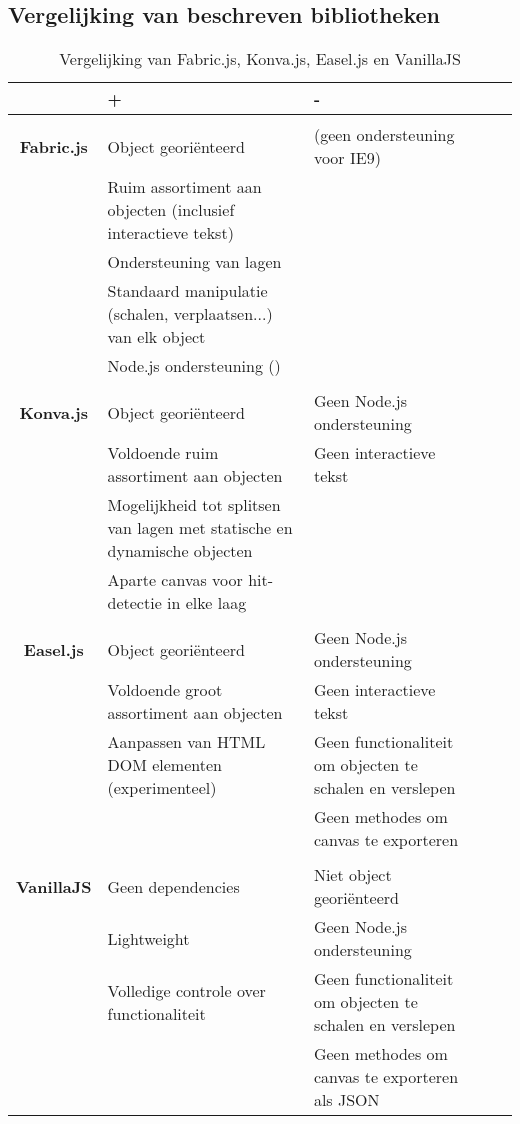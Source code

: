 \newpage
\subsection{Vergelijking van beschreven bibliotheken}

\begin{table}[ht!]
	\begin{center}
	\begin{tabular}[c]{clllc}
	\hline
	 & + & - \\
	\hline
						& & \\
	\textbf{Fabric.js}  & Object geori\"{e}nteerd &  (geen ondersteuning voor IE9)\\
						& Ruim assortiment aan objecten (inclusief interactieve tekst) &  \\
						& Ondersteuning van lagen &  \\
						& Standaard manipulatie (schalen, verplaatsen...) van elk object &  \\
						& Node.js ondersteuning () &  \\
						& & \\
	\textbf{Konva.js} 	& Object geori\"{e}nteerd & Geen Node.js ondersteuning \\
						& Voldoende ruim assortiment aan objecten & Geen interactieve tekst \\
						& Mogelijkheid tot splitsen van lagen met statische en dynamische objecten &  \\
						& Aparte canvas voor hit-detectie in elke laag &  \\
						& & \\
	\textbf{Easel.js} 	& Object geori\"{e}nteerd & Geen Node.js ondersteuning \\
						& Voldoende groot assortiment aan objecten & Geen interactieve tekst \\
						& Aanpassen van HTML DOM elementen (experimenteel)&  Geen functionaliteit om objecten te schalen en verslepen\\
						& &  Geen methodes om canvas te exporteren\\
						& & \\
	\textbf{VanillaJS} 	& Geen dependencies & Niet object geori\"{e}nteerd \\
						& Lightweight & Geen Node.js ondersteuning \\
						& Volledige controle over functionaliteit &  Geen functionaliteit om objecten te schalen en verslepen\\
						& &  Geen methodes om canvas te exporteren als JSON\\
	\hline
	\end{tabular}
	\caption{Vergelijking van Fabric.js, Konva.js, Easel.js en VanillaJS}
	\end{center}
	\end{table} 
	
